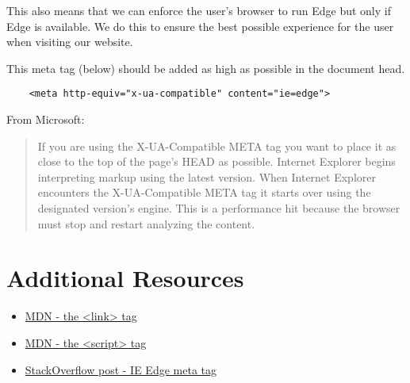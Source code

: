 This also means that we can enforce the user's browser to run Edge but only if Edge is available. We do this to ensure the best possible experience for the user when visiting our website.

This meta tag (below) should be added as high as possible in the document head.

\begin{verbatim}
    <meta http-equiv="x-ua-compatible" content="ie=edge">
\end{verbatim}

From Microsoft:

\begin{quotation}
    If you are using the X-UA-Compatible META tag you want to place it as close to the top of the page's HEAD as possible. Internet Explorer begins interpreting markup using the latest version. When Internet Explorer encounters the X-UA-Compatible META tag it starts over using the designated version's engine. This is a performance hit because the browser must stop and restart analyzing the content.
\end{quotation}

\section{Additional Resources}

\begin{itemize}[leftmargin=*]
    \item \href{https://developer.mozilla.org/en-US/docs/Web/HTML/Element/link}{MDN - the <link> tag}
    \item \href{https://developer.mozilla.org/en-US/docs/Web/HTML/Element/script}{MDN - the <script> tag}
    \item \href{https://stackoverflow.com/questions/6771258/what-does-meta-http-equiv-x-ua-compatible-content-ie-edge-do}{StackOverflow post - IE Edge meta tag}
\end{itemize}